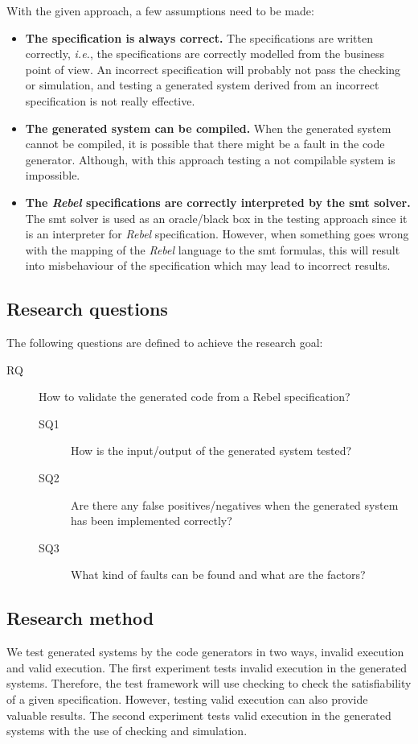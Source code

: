 With the given approach, a few assumptions need to be made:
\begin{itemize}
\item \textbf{The specification is always correct.}
The specifications are written correctly, \textit{i.e.}, the specifications are
correctly modelled from the business point of view. An incorrect specification
will probably not pass the checking or simulation, and testing a generated
system derived from an incorrect specification is not really effective.
\item \textbf{The generated system can be compiled.} When the generated
system cannot be compiled, it is possible that there might be a fault in the
code generator. Although, with this approach testing a not compilable system is
impossible.
\item \textbf{The \textit{Rebel} specifications are correctly interpreted by the \gls{smt}
solver.} The \gls{smt} solver is used as an oracle/black box in the testing approach
since it is an interpreter for \textit{Rebel} specification. However, when
something goes wrong with the mapping of the \textit{Rebel} language to the \gls{smt}
formulas, this will result into misbehaviour of the specification which may lead
to incorrect results.
\end{itemize}

\subsection{Research questions}\label{sec:research-questions}
The following questions are defined to achieve the research goal:

\begin{description}
  \item [RQ] How to validate the generated code from a Rebel specification?

  \begin{description}
    \item [SQ1] How is the input/output of the generated system tested?
    \item [SQ2] Are there any false positives/negatives when the generated
    system has been implemented correctly?
    \item [SQ3] What kind of faults can be found and what are the factors?
  \end{description}

\end{description}

\subsection{Research method}\label{sec:research-method}
We test generated systems by the code generators in two ways, invalid execution
and valid execution. The first experiment tests invalid execution in the
generated systems. Therefore, the test framework will use checking to check the
satisfiability of a given specification. However, testing valid execution can
also provide valuable results. The second experiment tests valid execution in
the generated systems with the use of checking and simulation.

